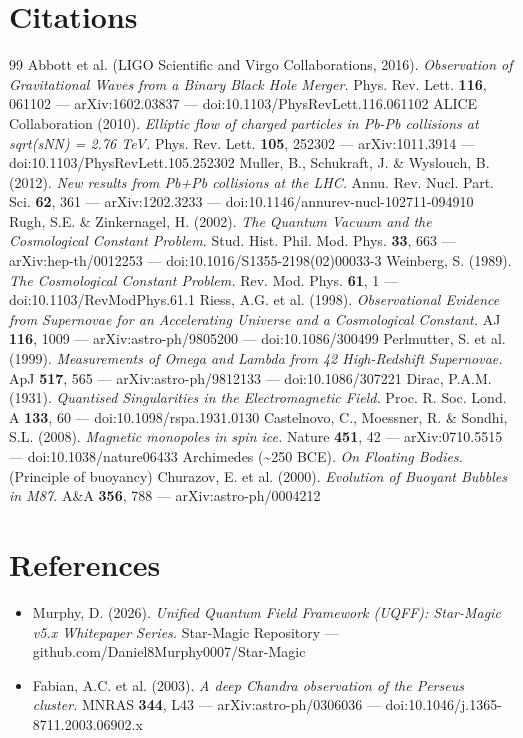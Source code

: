 \documentclass[12pt,a4paper]{article}
\begin{document}
\section*{Citations}
\begin{thebibliography}{99}
 Abbott et al. (LIGO Scientific and Virgo Collaborations, 2016). \emph{Observation of Gravitational Waves from a Binary Black Hole Merger.} Phys. Rev. Lett. \textbf{116}, 061102 --- arXiv:1602.03837 --- doi:10.1103/PhysRevLett.116.061102
 ALICE Collaboration (2010). \emph{Elliptic flow of charged particles in Pb-Pb collisions at sqrt(sNN) = 2.76 TeV.} Phys. Rev. Lett. \textbf{105}, 252302 --- arXiv:1011.3914 --- doi:10.1103/PhysRevLett.105.252302
 Muller, B., Schukraft, J. \& Wyslouch, B. (2012). \emph{New results from Pb+Pb collisions at the LHC.} Annu. Rev. Nucl. Part. Sci. \textbf{62}, 361 --- arXiv:1202.3233 --- doi:10.1146/annurev-nucl-102711-094910
 Rugh, S.E. \& Zinkernagel, H. (2002). \emph{The Quantum Vacuum and the Cosmological Constant Problem.} Stud. Hist. Phil. Mod. Phys. \textbf{33}, 663 --- arXiv:hep-th/0012253 --- doi:10.1016/S1355-2198(02)00033-3
 Weinberg, S. (1989). \emph{The Cosmological Constant Problem.} Rev. Mod. Phys. \textbf{61}, 1 --- doi:10.1103/RevModPhys.61.1
 Riess, A.G. et al. (1998). \emph{Observational Evidence from Supernovae for an Accelerating Universe and a Cosmological Constant.} AJ \textbf{116}, 1009 --- arXiv:astro-ph/9805200 --- doi:10.1086/300499
 Perlmutter, S. et al. (1999). \emph{Measurements of Omega and Lambda from 42 High-Redshift Supernovae.} ApJ \textbf{517}, 565 --- arXiv:astro-ph/9812133 --- doi:10.1086/307221
 Dirac, P.A.M. (1931). \emph{Quantised Singularities in the Electromagnetic Field.} Proc. R. Soc. Lond. A \textbf{133}, 60 --- doi:10.1098/rspa.1931.0130
 Castelnovo, C., Moessner, R. \& Sondhi, S.L. (2008). \emph{Magnetic monopoles in spin ice.} Nature \textbf{451}, 42 --- arXiv:0710.5515 --- doi:10.1038/nature06433
 Archimedes (\textasciitilde{}250 BCE). \emph{On Floating Bodies.} (Principle of buoyancy)
 Churazov, E. et al. (2000). \emph{Evolution of Buoyant Bubbles in M87.} A\&A \textbf{356}, 788 --- arXiv:astro-ph/0004212
\end{thebibliography}

\section*{References}
\begin{itemize}
  \item[2.] Murphy, D. (2026). \emph{Unified Quantum Field Framework (UQFF): Star-Magic v5.x Whitepaper Series.} Star-Magic Repository --- github.com/Daniel8Murphy0007/Star-Magic
  \item[13.] Fabian, A.C. et al. (2003). \emph{A deep Chandra observation of the Perseus cluster.} MNRAS \textbf{344}, L43 --- arXiv:astro-ph/0306036 --- doi:10.1046/j.1365-8711.2003.06902.x
\end{itemize}

\end{document}
